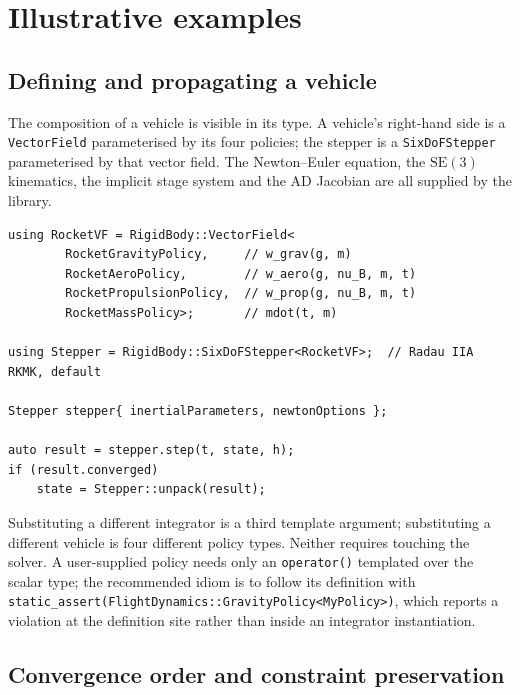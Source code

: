 \documentclass[preprint,12pt,a4paper]{elsarticle}
\newcommand{\SE}{\mathrm{SE}(3)}
\newcommand{\code}[1]{\texttt{\small #1}}
\begin{document}
\section{Illustrative examples}
\label{sec:examples}

\subsection{Defining and propagating a vehicle}

The composition of a vehicle is visible in its type. A vehicle's right-hand
side is a \code{VectorField} parameterised by its four policies; the stepper is
a \code{SixDoFStepper} parameterised by that vector field. The Newton--Euler
equation, the $\SE$ kinematics, the implicit stage system and the AD Jacobian
are all supplied by the library.

\begin{lstlisting}[caption={A complete vehicle definition and one integration step.}, label={lst:vehicle}]
using RocketVF = RigidBody::VectorField<
        RocketGravityPolicy,     // w_grav(g, m)
        RocketAeroPolicy,        // w_aero(g, nu_B, m, t)
        RocketPropulsionPolicy,  // w_prop(g, nu_B, m, t)
        RocketMassPolicy>;       // mdot(t, m)

using Stepper = RigidBody::SixDoFStepper<RocketVF>;  // Radau IIA RKMK, default

Stepper stepper{ inertialParameters, newtonOptions };

auto result = stepper.step(t, state, h);
if (result.converged)
    state = Stepper::unpack(result);
\end{lstlisting}

Substituting a different integrator is a third template argument; substituting
a different vehicle is four different policy types. Neither requires touching
the solver. A user-supplied policy needs only an \code{operator()} templated
over the scalar type; the recommended idiom is to follow its definition with
\code{static\_assert(FlightDynamics::GravityPolicy<MyPolicy>)}, which reports a
violation at the definition site rather than inside an integrator
instantiation.

\subsection{Convergence order and constraint preservation}
\end{document}
